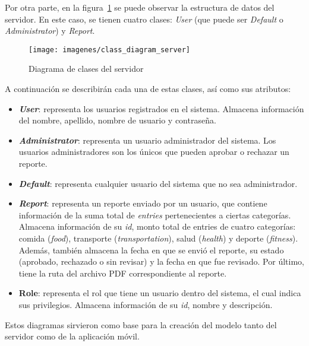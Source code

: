 Por otra parte, en la figura~\ref{fig:diagramaClasesServidor} se puede observar la estructura de datos del servidor. En este caso, se tienen cuatro clases: \textit{User} (que puede ser \textit{Default} o \textit{Administrator}) y \textit{Report}.

\begin{figure}[ht]
  \centering
  \texttt{[image: imagenes/class\_diagram\_server]}
  \caption{Diagrama de clases del servidor}
  \label{fig:diagramaClasesServidor}
\end{figure}

A continuación se describirán cada una de estas clases, así como sus atributos:

\begin{itemize}
	\item \textbf{\textit{User}}: representa los usuarios registrados en el sistema. Almacena información del nombre, apellido, nombre de usuario y contraseña. 
	\item \textbf{\textit{Administrator}}: representa un usuario administrador del sistema. Los usuarios administradores son los únicos que pueden aprobar o rechazar un reporte.
	\item \textbf{\textit{Default}}: representa cualquier usuario del sistema que no sea administrador.
	\item \textbf{\textit{Report}}: representa un reporte enviado por un usuario, que contiene información de la suma total de \textit{entries} pertenecientes a ciertas categorías. Almacena información de su \textit{id}, monto total de entries de cuatro categorías: comida (\textit{food}), transporte (\textit{transportation}), salud (\textit{health}) y deporte (\textit{fitness}). Además, también almacena la fecha en que se envió el reporte, su estado (aprobado, rechazado o sin revisar) y la fecha en que fue revisado. Por último, tiene la ruta del archivo PDF correspondiente al reporte.
	\item \textbf{Role}: representa el rol que tiene un usuario dentro del sistema, el cual indica sus privilegios. Almacena información de su \textit{id}, nombre y descripción.
\end{itemize} 

Estos diagramas sirvieron como base para la creación del modelo tanto del servidor como de la aplicación móvil. 
%
%
%
%
%

